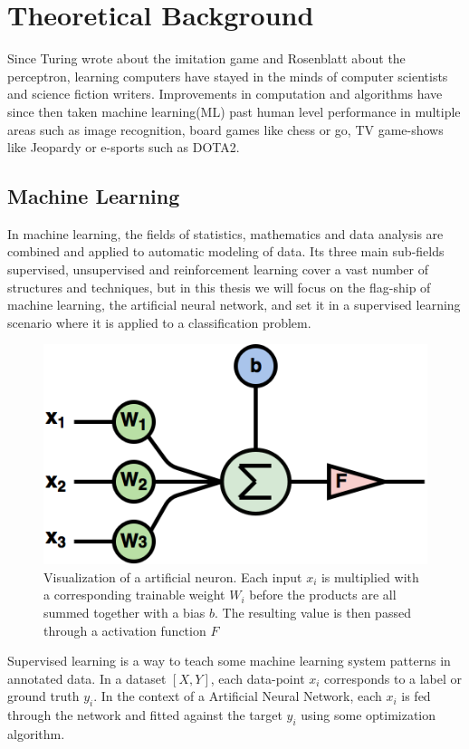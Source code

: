 \chapter{Theoretical Background}
Since Turing wrote about the imitation game\cite{imitationgame} and Rosenblatt about the perceptron\cite{perceptron}, learning computers have stayed in the minds of computer scientists and science fiction writers. 
Improvements in computation and algorithms have since then taken machine learning(ML) past human level performance in multiple areas such as image recognition\cite{youtubecats}\cite{deepface}, board games like chess\cite{alphazero} or go\cite{alphago}, TV game-shows like Jeopardy\cite{jeopardy} or e-sports such as DOTA2\cite{dota2}.

\section{Machine Learning}
 
In machine learning, the fields of statistics, mathematics and data analysis are combined and applied to automatic modeling of data. Its three main sub-fields supervised, unsupervised and reinforcement learning cover a vast number of structures and techniques, but in this thesis we will focus on the flag-ship of machine learning, the artificial neural network, and set it in a supervised learning scenario where it is applied to a classification problem.

\begin{figure}[h] 
\centering
\includegraphics[width=0.7\linewidth]{Chapters/Background/figures/artificial_neuron.png}
\caption{Visualization of a artificial neuron. Each input \(x_{i}\) is multiplied with a corresponding trainable weight \(W_{i}\) before the products are all summed together with a bias \(b\). The resulting value is then passed through a activation function \(F\)}
\label{fig:artificialneuron}
\end{figure}

Supervised learning is a way to teach some machine learning system patterns in annotated data. In a dataset \(\left [X, Y \right] \), each data-point \(x_{i}\) corresponds to a label or ground truth \(y_{i}\). In the context of a Artificial Neural Network, each \(x_{i}\) is fed through the network and fitted against the target \(y_{i}\) using some optimization algorithm. 


